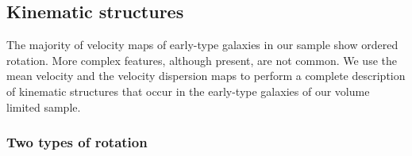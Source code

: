 \documentclass[usenatbib,usegraphicx]{mn2e}
\begin{document}
\subsection{Kinematic structures}
\label{ss:kin}

The majority of velocity maps of early-type galaxies in our sample show ordered rotation. More complex features, although present, are not common.  We use the mean velocity and the velocity dispersion maps to perform a complete description of kinematic structures that occur in the early-type galaxies of our volume limited sample. 

\subsubsection{Two types of rotation}
\label{sss:class}
\end{document}

